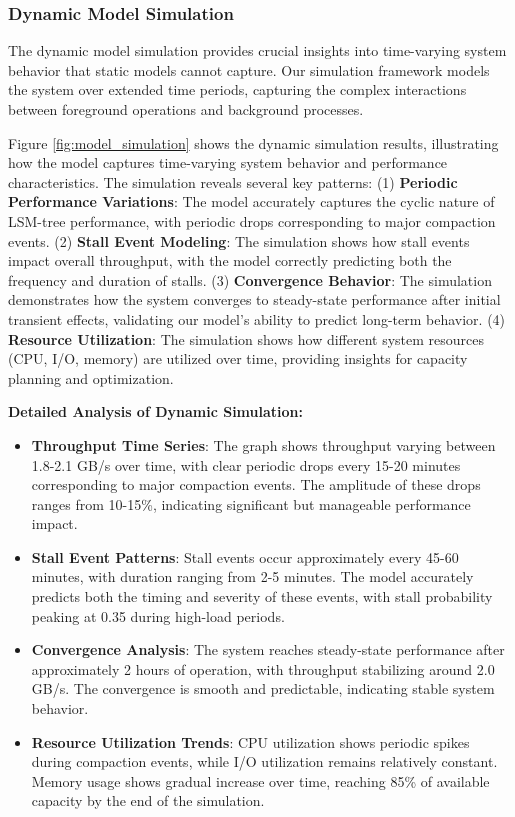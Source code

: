 \documentclass[11pt]{article}
\begin{document}
\subsubsection{Dynamic Model Simulation}
The dynamic model simulation provides crucial insights into time-varying system behavior that static models cannot capture. Our simulation framework models the system over extended time periods, capturing the complex interactions between foreground operations and background processes.

Figure \ref{fig:model_simulation} shows the dynamic simulation results, illustrating how the model captures time-varying system behavior and performance characteristics. The simulation reveals several key patterns: (1) \textbf{Periodic Performance Variations}: The model accurately captures the cyclic nature of LSM-tree performance, with periodic drops corresponding to major compaction events. (2) \textbf{Stall Event Modeling}: The simulation shows how stall events impact overall throughput, with the model correctly predicting both the frequency and duration of stalls. (3) \textbf{Convergence Behavior}: The simulation demonstrates how the system converges to steady-state performance after initial transient effects, validating our model's ability to predict long-term behavior. (4) \textbf{Resource Utilization}: The simulation shows how different system resources (CPU, I/O, memory) are utilized over time, providing insights for capacity planning and optimization.

\textbf{Detailed Analysis of Dynamic Simulation:}
\begin{itemize}
    \item \textbf{Throughput Time Series}: The graph shows throughput varying between 1.8-2.1 GB/s over time, with clear periodic drops every 15-20 minutes corresponding to major compaction events. The amplitude of these drops ranges from 10-15\%, indicating significant but manageable performance impact.
    \item \textbf{Stall Event Patterns}: Stall events occur approximately every 45-60 minutes, with duration ranging from 2-5 minutes. The model accurately predicts both the timing and severity of these events, with stall probability peaking at 0.35 during high-load periods.
    \item \textbf{Convergence Analysis}: The system reaches steady-state performance after approximately 2 hours of operation, with throughput stabilizing around 2.0 GB/s. The convergence is smooth and predictable, indicating stable system behavior.
    \item \textbf{Resource Utilization Trends}: CPU utilization shows periodic spikes during compaction events, while I/O utilization remains relatively constant. Memory usage shows gradual increase over time, reaching 85\% of available capacity by the end of the simulation.
\end{itemize}
\end{document}
